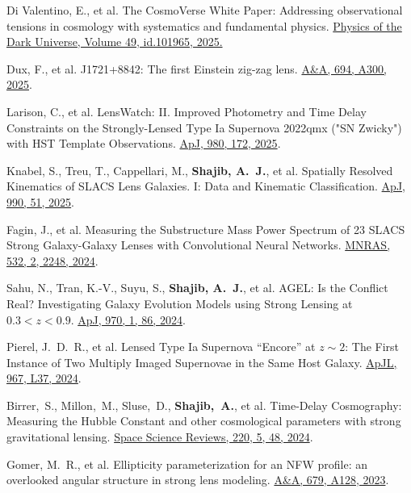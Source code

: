 \documentclass[margin, line]{res}
\begin{document}
\begin{resume}
\begin{etaremune}
	\item Di Valentino, E., et al. The CosmoVerse White Paper: Addressing observational tensions in cosmology with systematics and fundamental physics. \href{https://ui.adsabs.harvard.edu/abs/2025PDU....4901965D/abstract}{Physics of the Dark Universe, Volume 49, id.101965, 2025.}
	\item Dux, F., et al. J1721+8842: The first Einstein zig-zag lens. \href{https://ui.adsabs.harvard.edu/abs/2025A\%26A...694A.300D/abstract}{A\&A, 694, A300, 2025}.
	\item Larison, C., et al. LensWatch: II. Improved Photometry and Time Delay Constraints on the Strongly-Lensed Type Ia Supernova 2022qmx ("SN Zwicky") with HST Template Observations. \href{https://ui.adsabs.harvard.edu/abs/2025ApJ...980..172L/abstract}{ApJ, 980, 172, 2025}.
	\item Knabel, S., Treu, T., Cappellari, M., \textbf{Shajib, A.~J.}, et al. Spatially Resolved Kinematics of SLACS Lens Galaxies. I: Data and Kinematic Classification. \href{https://ui.adsabs.harvard.edu/abs/2025ApJ...990...51K/abstract}{ApJ, 990, 51, 2025}.
	\item Fagin, J., et al. Measuring the Substructure Mass Power Spectrum of 23 SLACS Strong Galaxy-Galaxy Lenses with Convolutional Neural Networks. \href{https://ui.adsabs.harvard.edu/abs/2024MNRAS.532.2248F/abstract}{MNRAS, 532, 2, 2248, 2024}.
	\item Sahu, N., Tran, K.-V., Suyu, S., \textbf{Shajib, A.~J.}, et al. AGEL: Is the Conflict Real? Investigating Galaxy Evolution Models using Strong Lensing at $0.3 < z < 0.9$. \href{https://ui.adsabs.harvard.edu/abs/2024ApJ...970...86S/abstract}{ApJ, 970, 1, 86, 2024}.
	\item Pierel, J.~D.~R., et al. Lensed Type Ia Supernova ``Encore'' at $z \sim 2$: The First Instance of Two Multiply Imaged Supernovae in the Same Host Galaxy. \href{https://ui.adsabs.harvard.edu/abs/2024ApJ...967L..37P/abstract}{ApJL, 967, L37, 2024}.
	\item Birrer,~S., Millon,~M., Sluse,~D., \textbf{Shajib,~A.}, et al. Time-Delay Cosmography: Measuring the Hubble Constant and other cosmological parameters with strong gravitational lensing. \href{https://ui.adsabs.harvard.edu/abs/2024SSRv..220...48B/abstract}{Space Science Reviews, 220, 5, 48, 2024}.
	\item Gomer, M.~R., et al. Ellipticity parameterization for an NFW profile: an overlooked angular structure in strong lens modeling. \href{https://ui.adsabs.harvard.edu/abs/2023A\%26A...679A.128G/abstract}{A\&A, 679, A128, 2023}.

\end{etaremune}
\end{resume}
\end{document}
